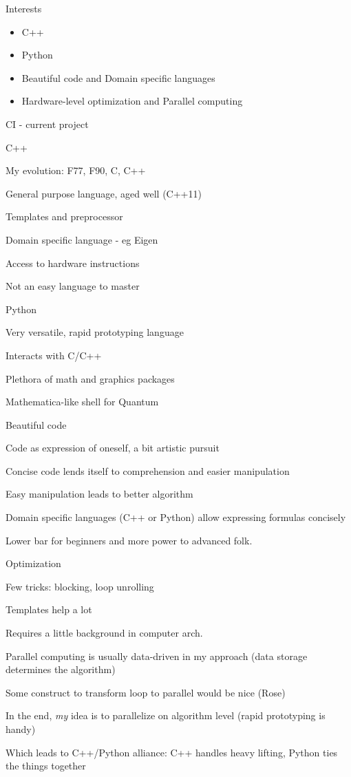 \documentclass{beamer}
\begin{document}
\begin{frame}{Interests}
\begin{itemize}
\item C++
\item Python
\item Beautiful code and Domain specific languages
\item Hardware-level optimization and Parallel computing
\end{itemize}
CI - current project
\end{frame}


\begin{frame}{C++}
\item My evolution:  F77, F90, C, C++
\item General purpose language, aged well (C++11)
\item Templates and preprocessor
\item Domain specific language - eg Eigen
\item Access to hardware instructions
\item Not an easy language to master
\end{frame}


\begin{frame}{Python}
\item Very versatile, rapid prototyping language
\item Interacts with C/C++
\item Plethora of math and graphics packages
\item Mathematica-like shell for Quantum
\end{frame}


\begin{frame}{Beautiful code}
\item Code as expression of oneself, a bit artistic pursuit
\item Concise code lends itself to comprehension and easier manipulation
\item Easy manipulation leads to better algorithm
\item Domain specific languages (C++ or Python) allow expressing formulas concisely
\item Lower bar for beginners and more power to advanced folk.
\end{frame}


\begin{frame}{Optimization}
\item Few tricks: blocking, loop unrolling
\item Templates help a lot
\item Requires a little background in computer arch.
\item Parallel computing is usually data-driven in my approach (data storage determines the algorithm)
\item Some construct to transform loop to parallel would be nice (Rose)
\item In the end, {\it my} idea is to parallelize on algorithm level (rapid prototyping is handy)
\item Which leads to C++/Python alliance: C++ handles heavy lifting, Python ties the things together
\end{frame}
\end{document}
